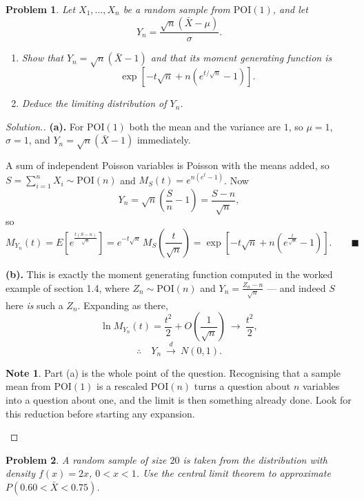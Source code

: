 \documentclass[12pt,a4paper]{report}
\theoremstyle{definition}
\newtheorem{note}[thm]{Note}
\theoremstyle{plain}
\newtheorem{problemx}{Problem}[section]
\newenvironment{problem}{\begin{problemx}}{\end{problemx}}
\newenvironment{solution}
  {\renewcommand{\qedsymbol}{}\begin{proof}[\textit{Solution}.]}
  {\end{proof}}
\begin{document}
\begin{problem}
Let $X_1,\ldots,X_n$ be a random sample from $\text{POI}(1)$, and let
\[Y_n=\frac{\sqrt n\left(\bar X-\mu\right)}{\sigma}.\]
\begin{enumerate}
\item[(a).] Show that $Y_n=\sqrt n\left(\bar X-1\right)$ and that its moment
generating function is
\[\exp\left[-t\sqrt n+n\left(e^{t/\sqrt n}-1\right)\right].\]
\item[(b).] Deduce the limiting distribution of $Y_n$.
\end{enumerate}
\end{problem}

\begin{solution}
\textbf{(a).} For $\text{POI}(1)$ both the mean and the variance are $1$, so
$\mu=1$, $\sigma=1$, and $Y_n=\sqrt n\left(\bar X-1\right)$ immediately.

A sum of independent Poisson variables is Poisson with the means added, so
$S=\sum_{i=1}^nX_i\sim\text{POI}(n)$ and $M_S(t)=e^{n\left(e^t-1\right)}$. Now
\[Y_n=\sqrt n\left(\frac{S}{n}-1\right)=\frac{S-n}{\sqrt n},\]
so
\[M_{Y_n}(t)=E\left[e^{\frac{t(S-n)}{\sqrt n}}\right]
=e^{-t\sqrt n}\,M_S\!\left(\frac{t}{\sqrt n}\right)
=\exp\left[-t\sqrt n+n\left(e^{\frac{t}{\sqrt n}}-1\right)\right].
\qquad\blacksquare\]

\textbf{(b).} This is exactly the moment generating function computed in the
worked example of section 1.4, where $Z_n\sim\text{POI}(n)$ and
$Y_n=\frac{Z_n-n}{\sqrt n}$ --- and indeed $S$ here \emph{is} such a $Z_n$.
Expanding as there,
\[\ln M_{Y_n}(t)=\frac{t^2}{2}+O\!\left(\frac{1}{\sqrt n}\right)
\ \longrightarrow\ \frac{t^2}{2},\]
\[\therefore\quad Y_n\ \overset{d}{\longrightarrow}\ N(0,1).\]

\begin{note}
Part (a) is the whole point of the question. Recognising that a sample mean from
$\text{POI}(1)$ is a rescaled $\text{POI}(n)$ turns a question about $n$ variables
into a question about one, and the limit is then something already done. Look for
this reduction before starting any expansion.
\end{note}
\end{solution}

\begin{problem}
A random sample of size $20$ is taken from the distribution with density
$f(x)=2x$, $0<x<1$. Use the central limit theorem to approximate
$P\left(0.60<\bar X<0.75\right)$.
\end{problem}
\end{document}
